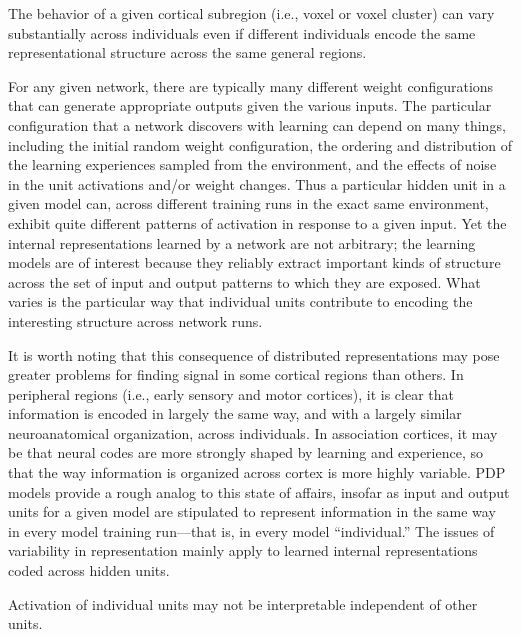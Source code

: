 \begin{APAenumerate}
\item The behavior of a given cortical subregion (i.e., voxel or voxel cluster) can vary substantially across individuals even if different individuals encode the same representational structure across the same general regions.

For any given network, there are typically many different weight configurations that can generate appropriate outputs given the various inputs. The particular configuration that a network discovers with learning can depend on many things, including the initial random weight configuration, the ordering and distribution of the learning experiences sampled from the environment, and the effects of noise in the unit activations and/or weight changes. Thus a particular hidden unit in a given model can, across different training runs in the exact same environment, exhibit quite different patterns of activation in response to a given input. Yet the internal representations learned by a network are not arbitrary; the learning models are of interest because they reliably extract important kinds of structure across the set of input and output patterns to which they are exposed. What varies is the particular way that individual units contribute to encoding the interesting structure across network runs.

It is worth noting that this consequence of distributed representations may pose greater problems for finding signal in some cortical regions than others. In peripheral regions (i.e., early sensory and motor cortices), it is clear that information is encoded in largely the same way, and with a largely similar neuroanatomical organization, across individuals. In association cortices, it may be that neural codes are more strongly shaped by learning and experience, so that the way information is organized across cortex is more highly variable. PDP models provide a rough analog to this state of affairs, insofar as input and output units for a given model are stipulated to represent information in the same way in every model training run---that is, in every model ``individual.'' The issues of variability in representation mainly apply to learned internal representations coded across hidden units.

\item Activation of individual units may not be interpretable independent of other units.


\end{APAenumerate}
